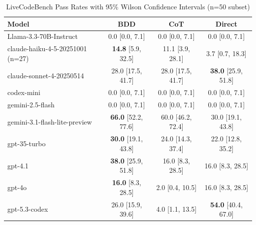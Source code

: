 \begin{table}[htbp]
\centering
\caption{LiveCodeBench Pass Rates with 95\% Wilson Confidence Intervals (n=50 subset)}
\label{tab:livecodebench_full}
\begin{tabular}{lccc}
\toprule
Model & BDD & CoT & Direct \\
\midrule
Llama-3.3-70B-Instruct & 0.0 [0.0, 7.1] & 0.0 [0.0, 7.1] & 0.0 [0.0, 7.1] \\
claude-haiku-4-5-20251001 (n=27) & \textbf{14.8} [5.9, 32.5] & 11.1 [3.9, 28.1] & 3.7 [0.7, 18.3] \\
claude-sonnet-4-20250514 & 28.0 [17.5, 41.7] & 28.0 [17.5, 41.7] & \textbf{38.0} [25.9, 51.8] \\
codex-mini & 0.0 [0.0, 7.1] & 0.0 [0.0, 7.1] & 0.0 [0.0, 7.1] \\
gemini-2.5-flash & 0.0 [0.0, 7.1] & 0.0 [0.0, 7.1] & 0.0 [0.0, 7.1] \\
gemini-3.1-flash-lite-preview & \textbf{66.0} [52.2, 77.6] & 60.0 [46.2, 72.4] & 30.0 [19.1, 43.8] \\
gpt-35-turbo & \textbf{30.0} [19.1, 43.8] & 24.0 [14.3, 37.4] & 22.0 [12.8, 35.2] \\
gpt-4.1 & \textbf{38.0} [25.9, 51.8] & 16.0 [8.3, 28.5] & 16.0 [8.3, 28.5] \\
gpt-4o & \textbf{16.0} [8.3, 28.5] & 2.0 [0.4, 10.5] & 16.0 [8.3, 28.5] \\
gpt-5.3-codex & 26.0 [15.9, 39.6] & 4.0 [1.1, 13.5] & \textbf{54.0} [40.4, 67.0] \\
\bottomrule
\end{tabular}
\end{table}